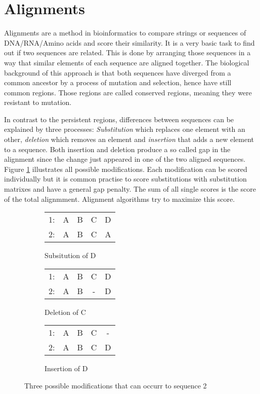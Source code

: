 \section{Alignments}
\label{sec:alignments}
Alignments are a method in bioinformatics to compare strings or sequences of DNA/RNA/Amino acids and score their similarity. 
It is a very basic task to find out if two sequences are related. 
This is done by arranging those sequences in a way that similar elements of each sequence are aligned together. The biological background of this approach is that
both sequences have diverged from a common ancestor by a process of mutation and selection\cite{durbin1998}, hence have still common regions. Those regions are called conserved regions, meaning they were resistant to mutation. 

In contrast to the persistent regions, differences between sequences can be explained by three processes: \textit{Substitution} which replaces one element with an other,  \textit{deletion} which removes an element and \textit{insertion} that adds a new element to a sequence.
Both insertion and deletion produce a so called gap in the alignment since the change just appeared in one of the two aligned sequences. Figure \ref{fig:alignmentbasic} illustrates all possible modifications.
Each modification can be scored individually but it is common practise to score substitutions with substitution matrixes and have a general gap penalty. The sum of all single scores is the score of the total alignmment.
Alignment algorithms try to maximize this score. 

\begin{figure}[h]
	\centering
	\begin{subfigure}[b]{0.3\textwidth}
	\begin{tabular}{c|cccc}
		1: &A&B&C&D\\
		2: &A&B&C&A\\
	\end{tabular}
	\caption{Subsitution of D} 
	\end{subfigure}
	\begin{subfigure}[b]{0.3\textwidth}
	\begin{tabular}{c|cccc}
		1:&A&B&C&D\\
		2:&A&B&-&D\\
	\end{tabular}
	\caption{Deletion of C} 
	\end{subfigure}
	\begin{subfigure}[b]{0.3\textwidth}
	\begin{tabular}{c|cccc}
		1:&A&B&C&-\\
		2:&A&B&C&D\\
	\end{tabular}
	\caption{Insertion of D}
	\end{subfigure}
	\caption{Three possible modifications that can occurr to sequence 2}
	\label{fig:alignmentbasic}
\end{figure}

